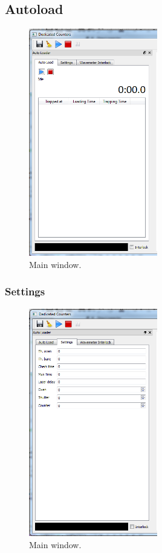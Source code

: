 \documentclass{scrartcl}
\begin{document}
\subsection{Autoload}
\begin{figure}[htbp]
\begin{center}
\includegraphics[width=0.5\textwidth]{Autoload}
\end{center}
\caption{\label{Autoload} Main window.}
\end{figure}

\subsubsection{Settings}
\begin{figure}[htbp]
\begin{center}
\includegraphics[width=0.5\textwidth]{AutoloadSettings}
\end{center}
\caption{\label{AutoloadSettings} Main window.}
\end{figure}
\end{document}
